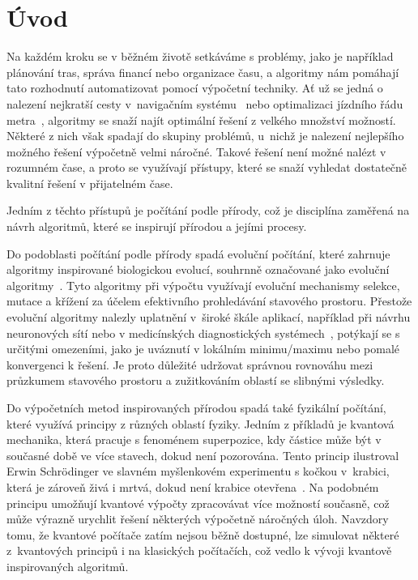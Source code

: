 \chapter{Úvod}
Na každém kroku se v běžném životě setkáváme s problémy, jako je například plánování tras, správa financí nebo organizace času, a algoritmy nám pomáhají tato rozhodnutí automatizovat pomocí výpočetní techniky. 
Ať už se jedná o nalezení nejkratší cesty v~navigačním systému~\cite{navigation} nebo optimalizaci jízdního řádu metra~\cite{metro}, algoritmy se snaží najít optimální řešení z velkého množství možností. 
Některé z nich však spadají do skupiny problémů, u~nichž je nalezení nejlepšího možného řešení výpočetně velmi náročné. 
Takové řešení není možné nalézt v rozumném čase, a proto se využívají přístupy, které se snaží vyhledat dostatečně kvalitní řešení v přijatelném čase. 

Jedním z těchto přístupů je počítání podle přírody, což je disciplína zaměřená na návrh algoritmů, které se inspirují přírodou a jejími procesy. 

Do podoblasti počítání podle přírody spadá evoluční počítání, které zahrnuje algoritmy inspirované biologickou evolucí, souhrnně označované jako evoluční algoritmy~\cite{IntroductionToEvoComputing}. 
Tyto algoritmy při výpočtu využívají evoluční mechanismy selekce, mutace a křížení za účelem efektivního prohledávání stavového prostoru. 
Přestože evoluční algoritmy nalezly uplatnění v~široké škále aplikací, například při návrhu neuronových sítí nebo v medicínských diagnostických systémech~\cite{ea-applications}, potýkají se s určitými omezeními, jako je uváznutí v lokálním minimu/maximu nebo pomalé konvergenci k řešení. 
Je proto důležité udržovat správnou rovnováhu mezi průzkumem stavového prostoru a zužitkováním oblastí se slibnými výsledky.

Do výpočetních metod inspirovaných přírodou spadá také fyzikální počítání, které využívá principy z různých oblastí fyziky. 
Jedním z příkladů je kvantová mechanika, která pracuje s fenoménem superpozice, kdy částice může být v současné době ve více stavech, dokud není pozorována. 
Tento princip ilustroval Erwin Schrödinger ve slavném myšlenkovém experimentu s kočkou v~krabici, která je zároveň živá i mrtvá, dokud není krabice otevřena~\cite{QuantumMechanics}. 
Na podobném principu umožňují kvantové výpočty zpracovávat více možností současně, což může výrazně urychlit řešení některých výpočetně náročných úloh. 
Navzdory tomu, že kvantové počítače zatím nejsou běžně dostupné, lze simulovat některé z~kvantových principů i na klasických počítačích, což vedlo k vývoji kvantově inspirovaných algoritmů. 

